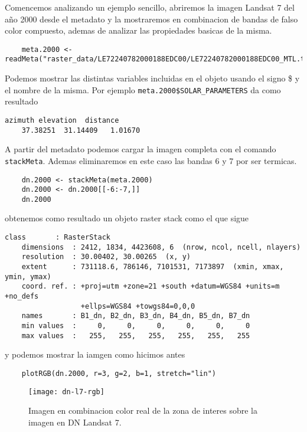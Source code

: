 \begin{exa}
   Comencemos analizando un ejemplo sencillo, abriremos la imagen Landsat 7
    del año 2000 desde el metadato y la mostraremos en combinacion de bandas de falso color
    compuesto, ademas de analizar las propiedades basicas de la misma.
    \begin{lstlisting}
    meta.2000 <- readMeta("raster_data/LE72240782000188EDC00/LE72240782000188EDC00_MTL.txt")
    \end{lstlisting}
    Podemos mostrar las distintas variables incluidas en el objeto usando el
    signo \$ y el nombre de la misma. Por ejemplo \verb|meta.2000$SOLAR_PARAMETERS|
    da como resultado
    \begin{Verbatim}[fontsize=\small]
     azimuth elevation  distance
    37.38251  31.14409   1.01670
    \end{Verbatim}
    A partir del metadato podemos cargar la imagen completa con el comando
    \texttt{stackMeta}. Ademas eliminaremos en este caso las bandas 6 y 7 por
    ser termicas.
    \begin{lstlisting}
    dn.2000 <- stackMeta(meta.2000)
    dn.2000 <- dn.2000[[-6:-7,]]
    dn.2000
    \end{lstlisting}
    obtenemos como resultado un objeto raster stack como el que sigue
    \begin{Verbatim}[fontsize=\small]
    class       : RasterStack
    dimensions  : 2412, 1834, 4423608, 6  (nrow, ncol, ncell, nlayers)
    resolution  : 30.00402, 30.00265  (x, y)
    extent      : 731118.6, 786146, 7101531, 7173897  (xmin, xmax, ymin, ymax)
    coord. ref. : +proj=utm +zone=21 +south +datum=WGS84 +units=m +no_defs
                  +ellps=WGS84 +towgs84=0,0,0
    names       : B1_dn, B2_dn, B3_dn, B4_dn, B5_dn, B7_dn
    min values  :     0,     0,     0,     0,     0,     0
    max values  :   255,   255,   255,   255,   255,   255
    \end{Verbatim}
    y podemos mostrar la iamgen como hicimos antes
    \begin{lstlisting}
    plotRGB(dn.2000, r=3, g=2, b=1, stretch="lin")
    \end{lstlisting}

     \begin{figure}[h!]
     \begin{center}
         \texttt{[image: dn-l7-rgb]}
     \end{center}
     \caption{Imagen en combinacion color real de la zona de interes sobre la
         imagen en DN Landsat 7.}
     \label{fig:dn-l7-rgb}
     \end{figure}
\end{exa}

